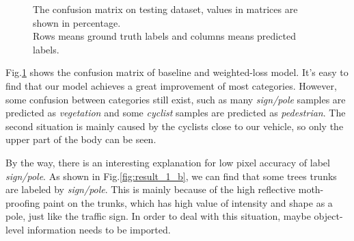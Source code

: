 \begin{figure} 
	\centering
	\hspace{.5in}
	
	\caption{
		The confusion matrix on testing dataset, values in matrices are shown in percentage.
		\protect\\
		Rows means ground truth labels and columns means predicted labels.
	}
	\label{fig:matrix}
\end{figure}

Fig.\ref{fig:matrix} shows the confusion matrix of baseline and weighted-loss model. It's easy to find that our model achieves a great improvement of most categories. However, some confusion between categories still exist, such as many \textit{sign/pole} samples are predicted as \textit{vegetation} and some \textit{cyclist} samples are predicted as \textit{pedestrian}. The second situation is mainly caused by the cyclists close to our vehicle, so only the upper part of the body can be seen.

By the way, there is an interesting explanation for low pixel accuracy of label \textit{sign/pole}. As shown in Fig.\ref{fig:result_1_b}, we can find that some trees trunks are labeled by \textit{sign/pole}. This is mainly because of the high reflective moth-proofing paint on the trunks, which has high value of intensity and shape as a pole, just like the traffic sign. In order to deal with this situation, maybe object-level information needs to be imported.


